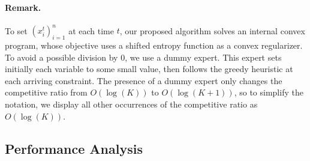 \paragraph{Remark.} To set $(x_i^t)_{i=1}^n$ at each time $t$, our proposed algorithm solves an internal convex program, whose objective uses a shifted entropy function as a convex regularizer. To avoid a possible division by $0$, we use a dummy expert. This expert sets initially each variable to some small value, then follows the greedy heuristic at each arriving constraint. The presence of a dummy expert only changes the competitive ratio from $O(\log(K))$ to $O(\log(K + 1))$, so to simplify the notation, we display all other occurrences of the competitive ratio as $O(\log(K))$.

\subsection{Performance Analysis}

